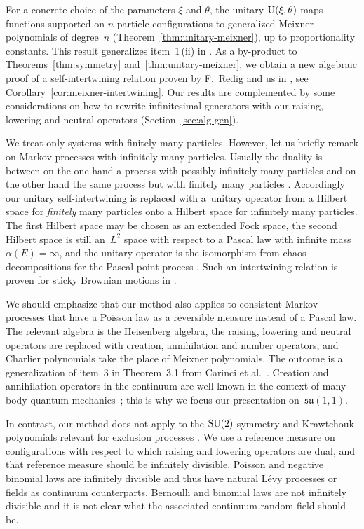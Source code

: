 \documentclass[10pt,a4paper]{amsart}
\numberwithin{equation}{section}
\newcommand{\1}{\mathbbm{1}}
\begin{document}
For a concrete choice of the parameters $\xi$ and $\theta$, the unitary ${\rm U}(\xi,\theta)$ maps functions supported on $n$-particle configurations to generalized Meixner polynomials of degree~$n$ (Theorem~\ref{thm:unitary-meixner}), up to proportionality constants. This result generalizes item~1\,(ii) in \cite[Theorem~3.1]{carinci2019orthogonal}.
As a by-product to Theorems~\ref{thm:symmetry} and~\ref{thm:unitary-meixner}, we obtain a new algebraic proof of a self-intertwining relation proven by F.~Redig and us in \cite{IntertwiningConsistent}, see Corollary~\ref{cor:meixner-intertwining}. Our results are complemented by some considerations on how to rewrite infinitesimal generators with our raising, lowering and neutral operators (Section~\ref{sec:alg-gen}).

We treat only systems with finitely many particles. However, let us briefly remark on Markov processes with infinitely many particles. Usually the duality is between on the one hand a process with possibly infinitely many particles and on the other hand the same process but with finitely many particles \cite[Section~III.4]{liggett_interacting_2005}. Accordingly our unitary self-intertwining is replaced with a~unitary operator from a Hilbert space for \emph{finitely} many particles onto a Hilbert space for infinitely many particles. The first Hilbert space may be chosen as an extended Fock space, the second Hilbert space is still an~$L^2$ space with respect to a Pascal law with infinite mass $\alpha(E) = \infty$, and the unitary operator is the isomorphism from chaos decompositions for the Pascal point process \cite[Corollary~5.3]{Lytvynov2003}. Such an intertwining relation is proven for sticky Brownian motions in \cite[Theorem~3.5]{wagner2023infinitely-many}.

We should emphasize that our method also applies to consistent Markov processes that have a Poisson law as a reversible measure instead of a Pascal law. The relevant algebra is the Heisenberg algebra, the raising, lowering and neutral operators are replaced with creation, annihilation and number operators, and Charlier polynomials take the place of Meixner polynomials. The outcome is a generalization of item~3 in Theorem~3.1 from Carinci et al.~\cite{carinci2019orthogonal}. Creation and annihilation operators in the continuum are well known in the context of many-body quantum mechanics~\cite{reedSimonII}; this is why we focus our presentation on~$\mathfrak{su}(1,1)$.

In contrast, our method does not apply to the ${\rm SU}(2)$ symmetry and Krawtchouk polynomials relevant for exclusion processes \cite{carinci2019orthogonal}. We use a reference measure on configurations with respect to which raising and lowering operators are dual, and that reference measure should be infinitely divisible. Poisson and negative binomial laws are infinitely divisible and thus have natural L{\'e}vy processes or fields as continuum counterparts. Bernoulli and binomial laws are not infinitely divisible and it is not clear what the associated continuum random field should be.
\end{document}
